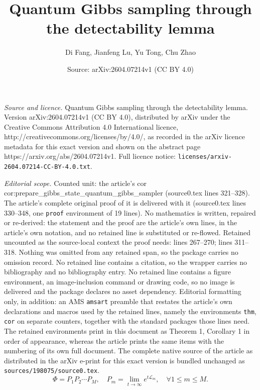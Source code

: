 \documentclass[10pt,a4paper]{amsart}
\title{Quantum Gibbs sampling through the detectability lemma}
\author{Di Fang, Jianfeng Lu, Yu Tong, Chu Zhao}
\date{Source: arXiv:2604.07214v1 (CC BY 4.0)}
\begin{document}
\maketitle

\noindent\emph{Source and licence.} Quantum Gibbs sampling through the detectability lemma. Version arXiv:2604.07214v1 (CC BY 4.0), distributed by arXiv under the Creative Commons Attribution 4.0 International licence, http://creativecommons.org/licenses/by/4.0/, as recorded in the arXiv licence metadata for this exact version and shown on the abstract page https://arxiv.org/abs/2604.07214v1. Full licence notice: \texttt{licenses/arxiv-2604.07214-CC-BY-4.0.txt}.\par\smallskip

\noindent\textit{Editorial scope.} Counted unit: the article's cor cor:prepare\_gibbs\_state\_quantum\_gibbs\_sampler (source0.tex lines 321--328). The article's complete original proof of it is delivered with it (source0.tex lines 330--348, one \texttt{proof} environment of 19 lines). No mathematics is written, repaired or re-derived: the statement and the proof are the article's own lines, in the article's own notation, and no retained line is substituted or re-flowed.  Retained uncounted as the source-local context the proof needs: lines 267--270; lines 311--318.  Nothing was omitted from any retained span, so the package carries no omission record.  No retained line contains a citation, so the wrapper carries no bibliography and no bibliography entry.  No retained line contains a figure environment, an image-inclusion command or drawing code, so no image is delivered and the package declares no asset dependency.  Editorial formatting only, in addition: an AMS \texttt{amsart} preamble that restates the article's own declarations and macros used by the retained lines, namely the environments \texttt{thm}, \texttt{cor} on separate counters, together with the standard packages those lines need.  The retained environments print in this document as Theorem 1, Corollary 1 in order of appearance, whereas the article prints the same items with the numbering of its own full document.  The complete native source of the article as distributed in the arXiv e-print for this exact version is bundled unchanged as \texttt{sources/198075/source0.tex}.
\begin{equation}
\label{eq:detectability_lem_op}
    \Phi = P_1 P_2\cdots P_M,\quad P_m = \lim_{t\to \infty} e^{t\mathcal{L}_m},\quad \forall 1\leq m\leq M.
\end{equation}
\end{document}
